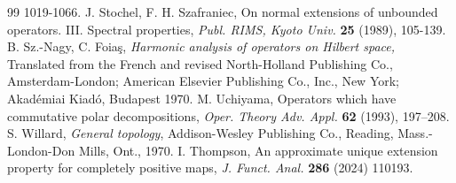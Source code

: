 \documentclass[reqno]{amsproc}
\numberwithin{equation}{section}
\theoremstyle{remark}
\theoremstyle{definition}
\begin{document}
\begin{thebibliography}{99}
1019-1066.
    J. Stochel, F. H.
Szafraniec, On normal extensions of
unbounded operators. III. Spectral
properties, {\it Publ. RIMS, Kyoto Univ.}
{\bf 25} (1989), 105-139.
    B. Sz.-Nagy, C.
Foia\c{s}, {\em Harmonic analysis of operators on
Hilbert space,} Translated from the French and revised
North-Holland Publishing Co., Amsterdam-London;
American Elsevier Publishing Co., Inc., New York;
Akad\'{e}miai Kiad\'{o}, Budapest 1970.
M. Uchiyama, Operators which have
commutative polar decompositions, {\em Oper.
Theory Adv. Appl.} {\bf 62} (1993),
197--208.
    S. Willard,  {\em General
topology}, Addison-Wesley Publishing Co., Reading,
Mass.-London-Don Mills, Ont., 1970.
    I. Thompson, An approximate
unique extension property for completely
positive maps, {\em J. Funct. Anal.} {\bf
286} (2024) 110193.
   \end{thebibliography}
   
\end{document}
